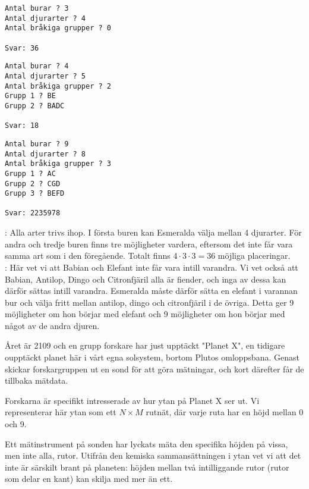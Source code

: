 \begin{multicols}{2}

\begin{verbatim}
Antal burar ? 3
Antal djurarter ? 4
Antal bråkiga grupper ? 0

Svar: 36
\end{verbatim}

\begin{verbatim}
Antal burar ? 4
Antal djurarter ? 5
Antal bråkiga grupper ? 2
Grupp 1 ? BE
Grupp 2 ? BADC

Svar: 18
\end{verbatim}

\begin{verbatim}
Antal burar ? 9
Antal djurarter ? 8
Antal bråkiga grupper ? 3
Grupp 1 ? AC
Grupp 2 ? CGD
Grupp 3 ? BEFD 

Svar: 2235978
\end{verbatim}

\vfill\columnbreak
{}: Alla arter trivs ihop. I första buren kan Esmeralda välja mellan 4 djurarter. För andra och tredje buren finns tre möjligheter vardera, eftersom det inte får vara samma art som i den föregående. Totalt finns $4\cdot 3\cdot 3=36$ möjliga placeringar.\\

: Här vet vi att Babian och Elefant inte får vara intill varandra. Vi vet också att Babian, Antilop, Dingo och Citronfjäril alla är fiender, och inga av dessa kan därför sättas intill varandra. Esmeralda måste därför sätta en elefant i varannan bur och välja fritt mellan antilop, dingo och citronfjäril i de övriga. Detta ger 9 möjligheter om hon börjar med elefant och 9 möjligheter om hon börjar med något av de andra djuren.

\end{multicols}

\newpage
{}

Året är 2109 och en grupp forskare har just upptäckt "Planet X", 
en tidigare oupptäckt planet här i vårt egna solsystem,
bortom Plutos omloppsbana. Genast skickar forskargruppen ut
en sond för att göra mätningar, och kort därefter får de tillbaka mätdata.

Forskarna är specifikt intresserade av hur ytan på Planet X ser ut.
Vi representerar här ytan som ett $N \times M$ rutnät, där varje ruta
har en höjd mellan 0 och 9.

Ett mätinstrument på sonden har lyckats mäta den specifika höjden
på vissa, men inte alla, rutor. Utifrån den kemiska sammansättningen i ytan vet vi att det inte 
är särskilt brant på planeten: höjden mellan två
intilliggande rutor (rutor som delar en kant) kan skilja 
med mer än ett. 

